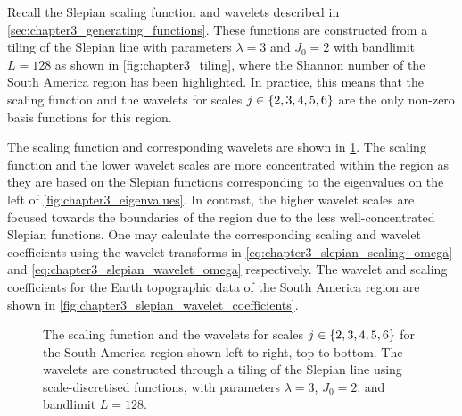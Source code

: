 Recall the Slepian scaling function and wavelets described in \cref{sec:chapter3_generating_functions}.
These functions are constructed from a tiling of the Slepian line with parameters \(\lambda=3\) and \(J_{0}=2\) with bandlimit \(L=128\) as shown in \cref{fig:chapter3_tiling}, where the Shannon number of the South America region has been highlighted.
In practice, this means that the scaling function and the wavelets for scales \(j \in \{2, 3, 4, 5, 6\}\) are the only non-zero basis functions for this region.

The scaling function and corresponding wavelets are shown in \cref{fig:chapter3_slepian_wavelets}.
The scaling function and the lower wavelet scales are more concentrated within the region as they are based on the Slepian functions corresponding to the eigenvalues on the left of \cref{fig:chapter3_eigenvalues}.
In contrast, the higher wavelet scales are focused towards the boundaries of the region due to the less well-concentrated Slepian functions.
One may calculate the corresponding scaling and wavelet coefficients using the wavelet transforms in \cref{eq:chapter3_slepian_scaling_omega} and \cref{eq:chapter3_slepian_wavelet_omega} respectively.
The wavelet and scaling coefficients for the Earth topographic data of the South America region are shown in \cref{fig:chapter3_slepian_wavelet_coefficients}.

\begin{figure}[htp]
	\centering
	\hfill
	\newline
	\hfill
	\newline
	\hfill
	\caption{
		The scaling function and the wavelets for scales \(j \in \{2, 3, 4, 5, 6\}\) for the South America region shown left-to-right, top-to-bottom.
		The wavelets are constructed through a tiling of the Slepian line using scale-discretised functions, with parameters \(\lambda=3\), \(J_{0}=2\), and bandlimit \(L=128\).
	}\label{fig:chapter3_slepian_wavelets}
\end{figure}

